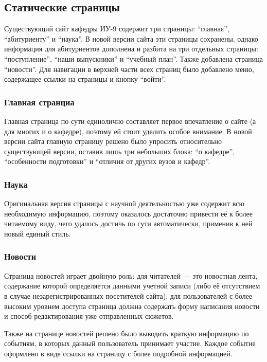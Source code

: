 \documentclass[14pt]{extarticle}
\begin{document}
\subsection{Статические страницы}
Существующий сайт кафедры ИУ-9 содержит три страницы: \enquote{главная}, \enquote{абитуриенту} и \enquote{наука}. В новой версии сайта эти страницы сохранены, однако информация для абитуриентов дополнена и разбита на три отдельных страницы: \enquote{поступление}, \enquote{наши выпускники} и \enquote{учебный план}. Также добавлена страница \enquote{новости}. Для навигации в верхней части всех страниц было добавлено меню, содержащее ссылки на страницы и кнопку \enquote{войти}.

\subsubsection{Главная странциа}
Главная страница по сути единолично составляет первое впечатление о сайте (а для многих и о кафедре), поэтому ей стоит уделить особое внимание. В новой версии сайта главную страницу решено было упросить относительно существующей версии, оставив лишь три небольших блока: \enquote{о кафедре}, \enquote{особенности подготовки} и \enquote{отличия от других вузов и кафедр}.

\subsubsection{Наука}
Оригинальная версия страницы с научной деятельностью уже содержит всю необходимую информацию, поэтому оказалось достаточно привести её к более читаемому виду, чего удалось достичь по сути автоматически, применив к ней новый единый стиль.

\subsubsection{Новости}
Страница новостей играет двойную роль: для читателей --- это новостная лента, содержание которой определяется данными учетной записи (либо её отсутствием в случае незарегистрированных посетителей сайта); для пользователей с более высоким уровнем доступа страница должна содержать форму написания новости и способ редактирования уже отправленных сюжетов. 

Также на странице новостей решено было выводить краткую информацию по событиям, в которых данный пользователь принимает участие. Каждое событие оформлено в виде ссылки на страницу с более подробной информацией.
\end{document}
